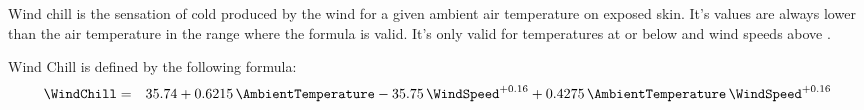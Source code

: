 
Wind chill is the sensation of cold produced by
the wind for a given ambient air temperature on exposed skin.
It's values are always lower than the air temperature in the range where the
formula is valid.
It's only valid for temperatures at or below  and wind speeds above .

\begin{definition}Wind Chill is defined by the following formula:
\begin{eqnarray*}
\WindChill &=& 35.74 + 0.6215\,\AmbientTemperature -35.75\,\WindSpeed^{+0.16} + 0.4275\,\AmbientTemperature\,\WindSpeed^{+0.16}
\end{eqnarray*}

\end{definition}